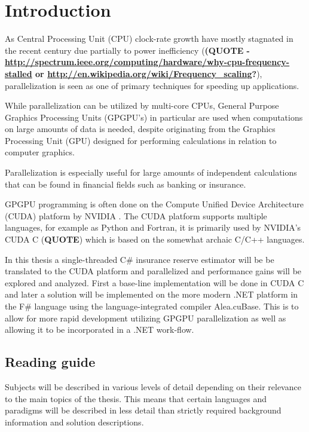 \section{Introduction}
As Central Processing Unit (CPU) clock-rate growth have mostly stagnated in the recent century due partially to power inefficiency (\textbf{(QUOTE - \url{http://spectrum.ieee.org/computing/hardware/why-cpu-frequency-stalled} or \url{http://en.wikipedia.org/wiki/Frequency_scaling}?}), parallelization is seen as one of primary techniques for speeding up applications.

While parallelization can be utilized by multi-core CPUs, General Purpose Graphics Processing Units (GPGPU's) in particular are used when computations on large amounts of data is needed, despite originating from the Graphics Processing Unit (GPU) designed for performing calculations in relation to computer graphics.

Parallelization is especially useful for large amounts of independent calculations that can be found in financial fields such as banking or insurance.

GPGPU programming is often done on the Compute Unified Device Architecture (CUDA) platform by NVIDIA \cite{NVIDIA}. 
The CUDA platform supports multiple languages, for example as Python and Fortran, it is primarily used by NVIDIA's CUDA C (\textbf{QUOTE}) which is based on the somewhat archaic C/C++ languages.

In this thesis a single-threaded C\# insurance reserve estimator will be be translated to the CUDA platform and parallelized and performance gains will be explored and analyzed.
First a base-line implementation will be done in CUDA C and later a solution will be implemented on the more modern .NET platform in the F\# language using the language-integrated compiler Alea.cuBase.
This is to allow for more rapid development utilizing GPGPU parallelization as well as allowing it to be incorporated in a .NET work-flow.


\subsection{Reading guide}
Subjects will be described in various levels of detail depending on their relevance to the main topics of the thesis.
This means that certain languages and paradigms will be described in less detail than strictly required background information and solution descriptions.

